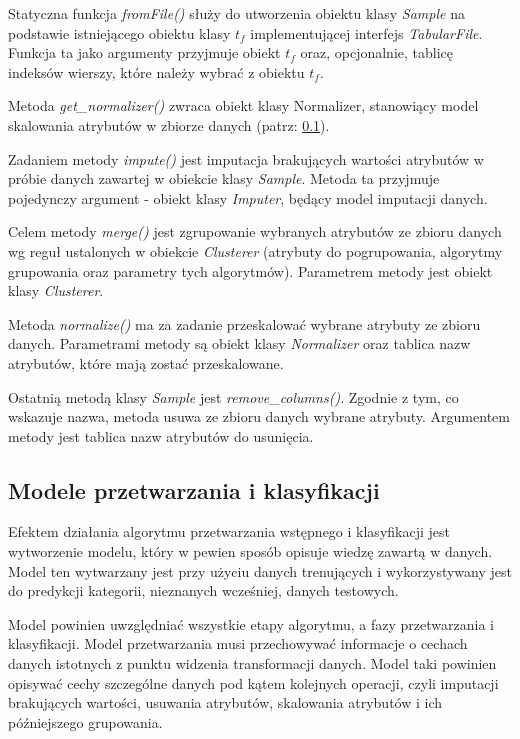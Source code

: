 \documentclass[../thesis.tex]{subfiles}
\begin{document}
Statyczna funkcja \emph{fromFile()} służy do utworzenia obiektu klasy \emph{Sample} na podstawie istniejącego obiektu klasy $t_f$ implementującej interfejs \emph{TabularFile}. Funkcja ta jako argumenty przyjmuje obiekt $t_f$ oraz, opcjonalnie, tablicę indeksów wierszy, które należy wybrać z obiektu $t_f$.

Metoda \emph{get\_normalizer()} zwraca obiekt klasy Normalizer, stanowiący model skalowania atrybutów w zbiorze danych (patrz: \ref{proj:models}). 

Zadaniem metody \emph{impute()} jest imputacja brakujących wartości atrybutów w próbie danych zawartej w obiekcie klasy \emph{Sample}. Metoda ta przyjmuje pojedynczy argument - obiekt klasy \emph{Imputer}, będący model imputacji danych.

Celem metody \emph{merge()} jest zgrupowanie wybranych atrybutów ze zbioru danych wg reguł ustalonych w obiekcie \emph{Clusterer} (atrybuty do pogrupowania, algorytmy grupowania oraz parametry tych algorytmów). Parametrem metody jest obiekt klasy \emph{Clusterer}.

Metoda \emph{normalize()} ma za zadanie przeskalować wybrane atrybuty ze zbioru danych. Parametrami metody są obiekt klasy \emph{Normalizer} oraz tablica nazw atrybutów, które mają zostać przeskalowane.

Ostatnią metodą klasy \emph{Sample} jest \emph{remove\_columns()}. Zgodnie z tym, co wskazuje nazwa, metoda usuwa ze zbioru danych wybrane atrybuty. Argumentem metody jest tablica nazw atrybutów do usunięcia.

\subsection{Modele przetwarzania i klasyfikacji}
\label{proj:models}

Efektem działania algorytmu przetwarzania wstępnego i klasyfikacji jest wytworzenie modelu, który w pewien sposób opisuje wiedzę zawartą w danych. Model ten wytwarzany jest przy użyciu danych trenujących i wykorzystywany jest do predykcji kategorii, nieznanych wcześniej, danych testowych. 

Model powinien uwzględniać wszystkie etapy algorytmu, a fazy przetwarzania i klasyfikacji. Model przetwarzania musi przechowywać informacje o cechach danych istotnych z punktu widzenia transformacji danych. Model taki powinien opisywać cechy szczególne danych pod kątem kolejnych operacji, czyli imputacji brakujących wartości, usuwania atrybutów, skalowania atrybutów i ich późniejszego grupowania.
\end{document}
